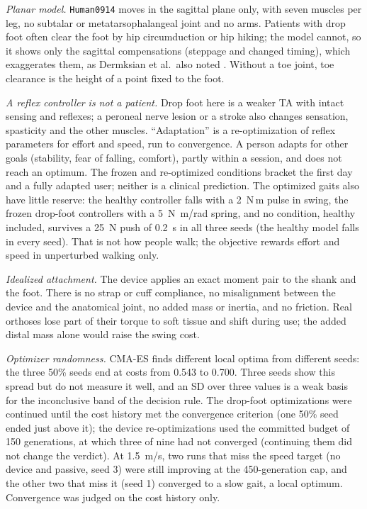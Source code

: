 \emph{Planar model.} \texttt{Human0914} moves in the sagittal plane only, with seven muscles per leg, no subtalar or metatarsophalangeal joint and no arms. Patients with drop foot often clear the foot by hip circumduction or hip hiking; the model cannot, so it shows only the sagittal compensations (steppage and changed timing), which exaggerates them, as Dermksian et al.\ also noted \cite{dermksian}. Without a toe joint, toe clearance is the height of a point fixed to the foot.

\emph{A reflex controller is not a patient.} Drop foot here is a weaker TA with intact sensing and reflexes; a peroneal nerve lesion or a stroke also changes sensation, spasticity and the other muscles. ``Adaptation'' is a re-optimization of reflex parameters for effort and speed, run to convergence. A person adapts for other goals (stability, fear of falling, comfort), partly within a session, and does not reach an optimum. The frozen and re-optimized conditions bracket the first day and a fully adapted user; neither is a clinical prediction. The optimized gaits also have little reserve: the healthy controller falls with a 2~N\,m pulse in swing, the frozen drop-foot controllers with a \SI{5}{N.m/rad} spring, and no condition, healthy included, survives a 25~N push of 0.2~s in all three seeds (the healthy model falls in every seed). That is not how people walk; the objective rewards effort and speed in unperturbed walking only.

\emph{Idealized attachment.} The device applies an exact moment pair to the shank and the foot. There is no strap or cuff compliance, no misalignment between the device and the anatomical joint, no added mass or inertia, and no friction. Real orthoses lose part of their torque to soft tissue and shift during use; the added distal mass alone would raise the swing cost.

\emph{Optimizer randomness.} CMA-ES finds different local optima from different seeds: the three 50\% seeds end at costs from 0.543 to 0.700. Three seeds show this spread but do not measure it well, and an SD over three values is a weak basis for the inconclusive band of the decision rule. The drop-foot optimizations were continued until the cost history met the convergence criterion (one 50\% seed ended just above it); the device re-optimizations used the committed budget of 150 generations, at which three of nine had not converged (continuing them did not change the verdict). At 1.5~m/s, two runs that miss the speed target (no device and passive, seed 3) were still improving at the 450-generation cap, and the other two that miss it (seed 1) converged to a slow gait, a local optimum. Convergence was judged on the cost history only.

